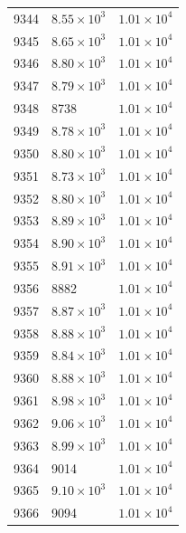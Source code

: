 \begin{table}[H]
\begin{tabular}{lll}
9344 & $\displaystyle 8.55 \times 10^{3}$ & $\displaystyle 1.01 \times 10^{4}$ \\
9345 & $\displaystyle 8.65 \times 10^{3}$ & $\displaystyle 1.01 \times 10^{4}$ \\
9346 & $\displaystyle 8.80 \times 10^{3}$ & $\displaystyle 1.01 \times 10^{4}$ \\
9347 & $\displaystyle 8.79 \times 10^{3}$ & $\displaystyle 1.01 \times 10^{4}$ \\
9348 & 8738 & $\displaystyle 1.01 \times 10^{4}$ \\
9349 & $\displaystyle 8.78 \times 10^{3}$ & $\displaystyle 1.01 \times 10^{4}$ \\
9350 & $\displaystyle 8.80 \times 10^{3}$ & $\displaystyle 1.01 \times 10^{4}$ \\
9351 & $\displaystyle 8.73 \times 10^{3}$ & $\displaystyle 1.01 \times 10^{4}$ \\
9352 & $\displaystyle 8.80 \times 10^{3}$ & $\displaystyle 1.01 \times 10^{4}$ \\
9353 & $\displaystyle 8.89 \times 10^{3}$ & $\displaystyle 1.01 \times 10^{4}$ \\
9354 & $\displaystyle 8.90 \times 10^{3}$ & $\displaystyle 1.01 \times 10^{4}$ \\
9355 & $\displaystyle 8.91 \times 10^{3}$ & $\displaystyle 1.01 \times 10^{4}$ \\
9356 & 8882 & $\displaystyle 1.01 \times 10^{4}$ \\
9357 & $\displaystyle 8.87 \times 10^{3}$ & $\displaystyle 1.01 \times 10^{4}$ \\
9358 & $\displaystyle 8.88 \times 10^{3}$ & $\displaystyle 1.01 \times 10^{4}$ \\
9359 & $\displaystyle 8.84 \times 10^{3}$ & $\displaystyle 1.01 \times 10^{4}$ \\
9360 & $\displaystyle 8.88 \times 10^{3}$ & $\displaystyle 1.01 \times 10^{4}$ \\
9361 & $\displaystyle 8.98 \times 10^{3}$ & $\displaystyle 1.01 \times 10^{4}$ \\
9362 & $\displaystyle 9.06 \times 10^{3}$ & $\displaystyle 1.01 \times 10^{4}$ \\
9363 & $\displaystyle 8.99 \times 10^{3}$ & $\displaystyle 1.01 \times 10^{4}$ \\
9364 & 9014 & $\displaystyle 1.01 \times 10^{4}$ \\
9365 & $\displaystyle 9.10 \times 10^{3}$ & $\displaystyle 1.01 \times 10^{4}$ \\
9366 & 9094 & $\displaystyle 1.01 \times 10^{4}$ \\

\end{tabular}
\end{table}
